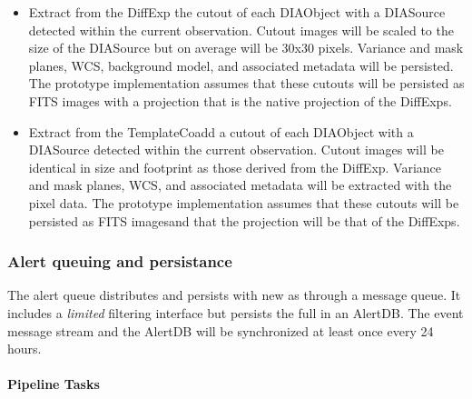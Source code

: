  \begin{itemize}
\item Extract from the DiffExp the cutout of each DIAObject with a DIASource detected within the current observation.  Cutout images will be scaled to the size of the DIASource but on average will be 30x30 pixels. Variance and mask planes, WCS, background model, and associated metadata will be persisted. The prototype implementation assumes that these cutouts will be persisted as FITS images with a projection that is the  native projection of the DiffExps.

\item Extract from the TemplateCoadd  a cutout of each DIAObject with a DIASource detected within the current observation.  Cutout images will be identical in size and footprint as those derived from the DiffExp. Variance and mask planes, WCS, and associated metadata will be extracted with the pixel data. The prototype implementation assumes that these cutouts will be persisted as FITS imagesand that the projection will be that of  the DiffExps.
\end{itemize}

\subsubsection{Alert queuing and persistance}
\label{sec:apQueue}

The alert queue  distributes and persists \DIAObject with new \DIASources as \VOEvents through a message queue. It includes a {\it limited} filtering interface but persists the full \VOEvents in an AlertDB. The event message stream and the AlertDB will be  synchronized at least once every 24 hours.


\paragraph{Pipeline Tasks}

